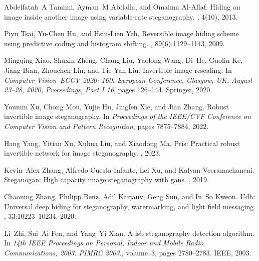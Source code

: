 \documentclass{article}
\begin{document}
\begin{thebibliography}{}
	Abdelfatah~A Tamimi, Ayman~M Abdalla, and Omaima Al-Allaf.
	\newblock Hiding an image inside another image using variable-rate
	steganography.
	, 4(10), 2013.
	
	Piyu Tsai, Yu-Chen Hu, and Hsiu-Lien Yeh.
	\newblock Reversible image hiding scheme using predictive coding and histogram
	shifting.
	, 89(6):1129--1143, 2009.
	
	Mingqing Xiao, Shuxin Zheng, Chang Liu, Yaolong Wang, Di~He, Guolin Ke, Jiang
	Bian, Zhouchen Lin, and Tie-Yan Liu.
	\newblock Invertible image rescaling.
	\newblock In {\em Computer Vision--ECCV 2020: 16th European Conference,
		Glasgow, UK, August 23--28, 2020, Proceedings, Part I 16}, pages 126--144.
	Springer, 2020.
	
	Youmin Xu, Chong Mou, Yujie Hu, Jingfen Xie, and Jian Zhang.
	\newblock Robust invertible image steganography.
	\newblock In {\em Proceedings of the IEEE/CVF Conference on Computer Vision and
		Pattern Recognition}, pages 7875--7884, 2022.
	
	Hang Yang, Yitian Xu, Xuhua Liu, and Xiaodong Ma.
	\newblock Pris: Practical robust invertible network for image steganography.
	, 2023.
	
	Kevin~Alex Zhang, Alfredo Cuesta-Infante, Lei Xu, and Kalyan Veeramachaneni.
	\newblock Steganogan: High capacity image steganography with gans.
	, 2019.
	
	Chaoning Zhang, Philipp Benz, Adil Karjauv, Geng Sun, and In~So Kweon.
	\newblock Udh: Universal deep hiding for steganography, watermarking, and light
	field messaging.
	,
	33:10223--10234, 2020.
	
	Li~Zhi, Sui~Ai Fen, and Yang~Yi Xian.
	\newblock A lsb steganography detection algorithm.
	\newblock In {\em 14th IEEE Proceedings on Personal, Indoor and Mobile Radio
		Communications, 2003. PIMRC 2003.}, volume~3, pages 2780--2783. IEEE, 2003.
	

\end{thebibliography}
\end{document}

